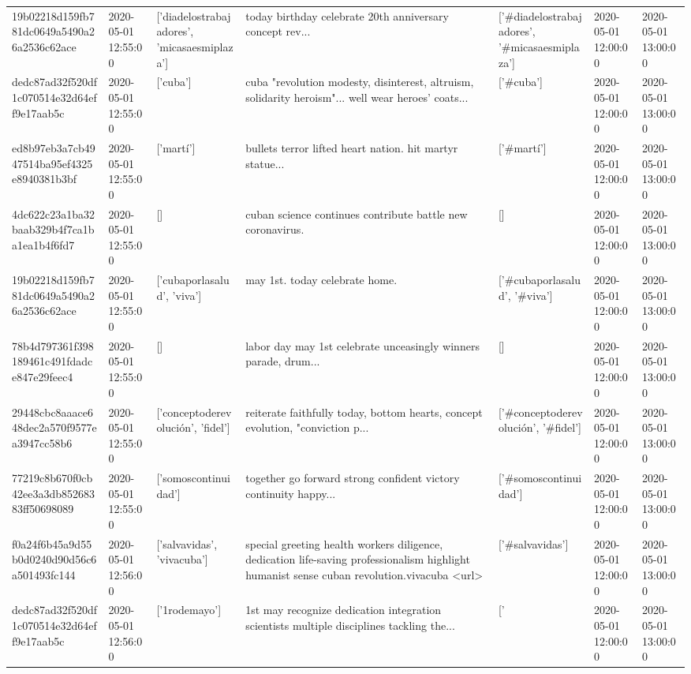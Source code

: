 \begin{tabular}{lllllll}
19b02218d159fb781dc0649a5490a26a2536c62ace & 2020-05-01 12:55:00 & ['diadelostrabajadores', 'micasaesmiplaza'] & today birthday celebrate 20th anniversary concept rev... & ['#diadelostrabajadores', '#micasaesmiplaza'] & 2020-05-01 12:00:00 & 2020-05-01 13:00:00 \\
dedc87ad32f520df1c070514e32d64eff9e17aab5c & 2020-05-01 12:55:00 & ['cuba'] & cuba "revolution modesty, disinterest, altruism, solidarity heroism"... well wear heroes' coats... & ['#cuba'] & 2020-05-01 12:00:00 & 2020-05-01 13:00:00 \\
ed8b97eb3a7cb4947514ba95ef4325e8940381b3bf & 2020-05-01 12:55:00 & ['martí'] & bullets terror lifted heart nation. hit martyr statue... & ['#martí'] & 2020-05-01 12:00:00 & 2020-05-01 13:00:00 \\
4dc622c23a1ba32baab329b4f7ca1ba1ea1b4f6fd7 & 2020-05-01 12:55:00 & [] & cuban science continues contribute battle new coronavirus. & [] & 2020-05-01 12:00:00 & 2020-05-01 13:00:00 \\
19b02218d159fb781dc0649a5490a26a2536c62ace & 2020-05-01 12:55:00 & ['cubaporlasalud', 'viva'] & may 1st. today celebrate home. & ['#cubaporlasalud', '#viva'] & 2020-05-01 12:00:00 & 2020-05-01 13:00:00 \\
78b4d797361f398189461c491fdadce847e29feec4 & 2020-05-01 12:55:00 & [] & labor day may 1st celebrate unceasingly winners parade, drum... & [] & 2020-05-01 12:00:00 & 2020-05-01 13:00:00 \\
29448cbc8aaace648dec2a570f9577ea3947cc58b6 & 2020-05-01 12:55:00 & ['conceptoderevolución', 'fidel'] & reiterate faithfully today, bottom hearts, concept evolution, "conviction p... & ['#conceptoderevolución', '#fidel'] & 2020-05-01 12:00:00 & 2020-05-01 13:00:00 \\
77219c8b670f0cb42ee3a3db85268383ff50698089 & 2020-05-01 12:55:00 & ['somoscontinuidad'] & together go forward strong confident victory continuity happy... & ['#somoscontinuidad'] & 2020-05-01 12:00:00 & 2020-05-01 13:00:00 \\
f0a24f6b45a9d55b0d0240d90d56c6a501493fc144 & 2020-05-01 12:56:00 & ['salvavidas', 'vivacuba'] & special greeting health workers diligence, dedication life-saving professionalism highlight humanist sense cuban revolution.vivacuba <url> & ['#salvavidas'] & 2020-05-01 12:00:00 & 2020-05-01 13:00:00 \\
dedc87ad32f520df1c070514e32d64eff9e17aab5c & 2020-05-01 12:56:00 & ['1rodemayo'] & 1st may recognize dedication integration scientists multiple disciplines tackling the... & ['#1rodemayo'] & 2020-05-01 12:00:00 & 2020-05-01 13:00:00 \\

\end{tabular}
